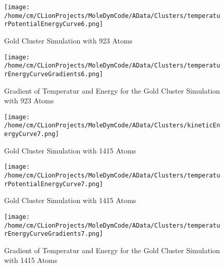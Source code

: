 \begin{figure}[!h] 
    \begin{center} 
        \texttt{[image: /home/cm/CLionProjects/MoleDymCode/AData/Clusters/temperaturPotentialEnergyCurve6.png]} 
    \end{center} 
    \caption[Gold Cluster Simulation with 923 Atoms]{Gold Cluster Simulation with 923 Atoms} 
    \label{GoldClusterSimulationTemperaturEnergy923} 
\end{figure} 
 
\begin{figure}[!h] 
    \begin{center} 
        \texttt{[image: /home/cm/CLionProjects/MoleDymCode/AData/Clusters/temperaturEnergyCurveGradients6.png]} 
    \end{center} 
    \caption[Gradient of Temperatur and Energy for the Gold Cluster Simulation with 923 Atoms]{Gradient of Temperatur and Energy for the Gold Cluster Simulation with 923 Atoms} 
    \label{GoldClusterSimulationGradient923} 
\end{figure} 
 
\begin{figure}[!h] 
    \begin{center} 
        \texttt{[image: /home/cm/CLionProjects/MoleDymCode/AData/Clusters/kineticEnergyCurve7.png]} 
    \end{center} 
    \caption[Gold Cluster Simulation with 1415 Atoms]{Gold Cluster Simulation with 1415 Atoms} 
    \label{GoldClusterSimulationKineticTime1415} 
\end{figure} 
 
\begin{figure}[!h] 
    \begin{center} 
        \texttt{[image: /home/cm/CLionProjects/MoleDymCode/AData/Clusters/temperaturPotentialEnergyCurve7.png]} 
    \end{center} 
    \caption[Gold Cluster Simulation with 1415 Atoms]{Gold Cluster Simulation with 1415 Atoms} 
    \label{GoldClusterSimulationTemperaturEnergy1415} 
\end{figure} 
 
\begin{figure}[!h] 
    \begin{center} 
        \texttt{[image: /home/cm/CLionProjects/MoleDymCode/AData/Clusters/temperaturEnergyCurveGradients7.png]} 
    \end{center} 
    \caption[Gradient of Temperatur and Energy for the Gold Cluster Simulation with 1415 Atoms]{Gradient of Temperatur and Energy for the Gold Cluster Simulation with 1415 Atoms} 
    \label{GoldClusterSimulationGradient1415} 
\end{figure} 
 
